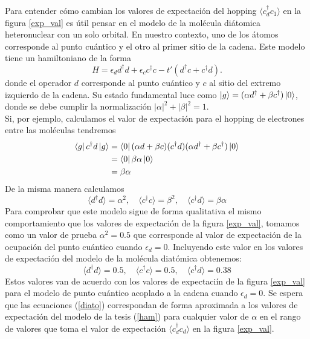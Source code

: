Para entender c\'{o}mo cambian los valores de expectaci\'{o}n del hopping $\langle c_d^\dagger c_1\rangle$ en la figura \ref{exp_val} es \'{u}til pensar en el modelo de la mol\'{e}cula di\'{a}tomica heteronuclear con un solo orbital. En nuestro contexto, uno de los \'{a}tomos corresponde al punto cu\'{a}ntico y el otro al primer sitio de la cadena. Este modelo tiene un hamiltoniano de la forma 
\begin{equation}
    H=\epsilon_d d^\dagger d + \epsilon_c c^\dagger c-t'( d^\dagger c + c^\dagger d).
    \label{hammy_diatomica}
\end{equation}
donde el operador $d$ corresponde al punto cu\'{a}ntico y $c$ al sitio del extremo izquierdo de la cadena.  
Su estado fundamental luce como $\ket{g}=(\alpha d^\dagger+\beta c^\dagger)\ket{0}$, donde se debe cumplir la normalizaci\'{o}n $|\alpha|^2+|\beta|^2=1$.\\
Si, por ejemplo, calculamos el valor de expectaci\'{o}n para el hopping de electrones entre las mol\'{e}culas tendremos
\begin{equation}
    \begin{split}
        \bra{g}c^\dagger d\ket{g}&=\bra{0}(\alpha d+ \beta c)(c^\dagger d)(\alpha d^\dagger + \beta c^\dagger)\ket{0}\\
        &=\bra{0}\beta\alpha\ket0\\
        &=\beta\alpha
    \end{split}
\end{equation}
De la misma manera calculamos
\begin{equation}
  \langle d^\dagger d\rangle=\alpha^2,\quad \langle c^\dagger c\rangle=\beta^2,\quad \langle c^\dagger d \rangle= \beta\alpha
  \label{diato}
\end{equation}
Para comprobar que este modelo sigue de forma qualitativa el mismo comportamiento que los valores de expectaci\'{o}n de la figura \ref{exp_val}, tomamos como un valor de prueba $\alpha^2=0.5$ que corresponde al valor de expectaci\'{o}n de la ocupaci\'{o}n del punto cu\'{a}ntico cuando $\epsilon_d=0$. Incluyendo este valor en los valores de expectaci\'{o}n del modelo de la mol\'{e}cula diat\'{o}mica obtenemos:
\begin{equation}
    \langle d^\dagger d\rangle=0.5,\quad \langle c^\dagger c\rangle=0.5,\quad \langle c^\dagger d\rangle=0.38
\end{equation}
Estos valores van de acuerdo con los valores de expectaci\'{i}n de la figura \ref{exp_val} para el modelo de punto cu\'{a}ntico acoplado a la cadena cuando $\epsilon_d=0$. Se espera que las ecuaciones (\ref{diato}) correspondan de forma aproximada a los valores de expectaci\'{o}n del modelo de la tesis (\ref{ham}) para cualquier valor de $\alpha$ en el rango de valores que toma el valor de expectaci\'{o}n $\langle c_d^\dagger c_d\rangle$ en la figura \ref{exp_val}.
%
%
%
